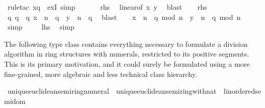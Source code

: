 \begin{isabellebody}
\ {\isacharparenleft}{\kern0pt}rule{\isacharunderscore}{\kern0pt}tac\ x{\isacharequal}{\kern0pt}{\isachardoublequoteopen}q{\isachardoublequoteclose}\ \ exI{\isacharcomma}{\kern0pt}\ simp{\isacharparenright}{\kern0pt}\isacommand{{\isacharbraceright}{\kern0pt}}\isamarkupfalse%
\isanewline
\ \ \isamarkupfalse%
\ \ \isamarkupfalse%
\ {\isacharquery}{\kern0pt}rhs\ \isamarkupfalse%
\ linear{\isacharbrackleft}{\kern0pt}of\ x\ y{\isacharbrackright}{\kern0pt}\ \isamarkupfalse%
\ blast\isanewline
{}\isamarkupfalse%
\isanewline
\ \ \isamarkupfalse%
\ {\isacharquery}{\kern0pt}rhs\ \isamarkupfalse%
\ \isamarkupfalse%
\ q{}\ q{}\ \ q{}{}{\isacharcolon}{\kern0pt}\ {\isachardoublequoteopen}x\ {\isacharplus}{\kern0pt}\ n\ {\isacharasterisk}{\kern0pt}\ q{}\ {\isacharequal}{\kern0pt}\ y\ {\isacharplus}{\kern0pt}\ n\ {\isacharasterisk}{\kern0pt}\ q{}{\isachardoublequoteclose}\ \isamarkupfalse%
\ blast\isanewline
\ \ \isamarkupfalse%
\ {\isachardoublequoteopen}{\isacharparenleft}{\kern0pt}x\ {\isacharplus}{\kern0pt}\ n\ {\isacharasterisk}{\kern0pt}\ q{}{\isacharparenright}{\kern0pt}\ mod\ n\ {\isacharequal}{\kern0pt}\ {\isacharparenleft}{\kern0pt}y\ {\isacharplus}{\kern0pt}\ n\ {\isacharasterisk}{\kern0pt}\ q{}{\isacharparenright}{\kern0pt}\ mod\ n{\isachardoublequoteclose}\ \isamarkupfalse%
\ simp\isanewline
\ \ \isamarkupfalse%
\ \ {\isacharquery}{\kern0pt}lhs\ \isamarkupfalse%
\ simp\isanewline
{}\isamarkupfalse%
%
\endisatagproof
{\isafoldproof}%
%
\isadelimproof
%
\endisadelimproof
%
\isadelimdocument
%
\endisadelimdocument
%
\isatagdocument
%
\isamarkuptrue%
%
\endisatagdocument
{\isafolddocument}%
%
\isadelimdocument
%
\endisadelimdocument
%
\begin{isamarkuptext}%
The following type class contains everything necessary to formulate
  a division algorithm in ring structures with numerals, restricted
  to its positive segments.  This is its primary motivation, and it
  could surely be formulated using a more fine-grained, more algebraic
  and less technical class hierarchy.%
\end{isamarkuptext}\isamarkuptrue%
\isamarkupfalse%
\ unique{\isacharunderscore}{\kern0pt}euclidean{\isacharunderscore}{\kern0pt}semiring{\isacharunderscore}{\kern0pt}numeral\ {\isacharequal}{\kern0pt}\ unique{\isacharunderscore}{\kern0pt}euclidean{\isacharunderscore}{\kern0pt}semiring{\isacharunderscore}{\kern0pt}with{\isacharunderscore}{\kern0pt}nat\ {\isacharplus}{\kern0pt}\ linordered{\isacharunderscore}{\kern0pt}semidom\ {\isacharplus}{\kern0pt}\isanewline

\end{isabellebody}
